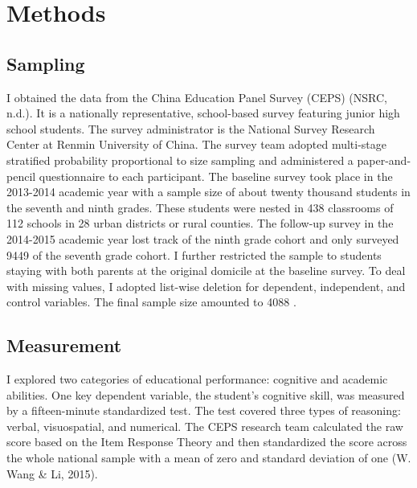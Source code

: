 \documentclass[
  man,floatsintext]{apa7}
\begin{document}
\newpage

\hypertarget{methods}{%
\section{Methods}\label{methods}}

\hypertarget{sampling}{%
\subsection{Sampling}\label{sampling}}

I obtained the data from the China Education Panel Survey (CEPS) (NSRC, n.d.). It is a nationally representative, school-based survey featuring junior high school students. The survey administrator is the National Survey Research Center at Renmin University of China. The survey team adopted multi-stage stratified probability proportional to size sampling and administered a paper-and-pencil questionnaire to each participant. The baseline survey took place in the 2013-2014 academic year with a sample size of about twenty thousand students in the seventh and ninth grades. These students were nested in 438 classrooms of 112 schools in 28 urban districts or rural counties. The follow-up survey in the 2014-2015 academic year lost track of the ninth grade cohort and only surveyed 9449 of the seventh grade cohort. I further restricted the sample to students staying with both parents at the original domicile at the baseline survey. To deal with missing values, I adopted list-wise deletion for dependent, independent, and control variables. The final sample size amounted to 4088 .

\hypertarget{measurement}{%
\subsection{Measurement}\label{measurement}}

I explored two categories of educational performance: cognitive and academic abilities. One key dependent variable, the student's cognitive skill, was measured by a fifteen-minute standardized test. The test covered three types of reasoning: verbal, visuospatial, and numerical. The CEPS research team calculated the raw score based on the Item Response Theory and then standardized the score across the whole national sample with a mean of zero and standard deviation of one (W. Wang \& Li, 2015).
\end{document}
